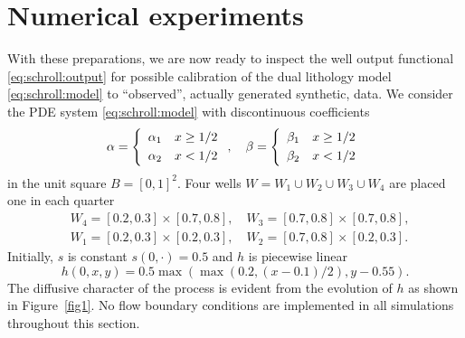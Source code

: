 \section{Numerical experiments}

With these preparations, we are now ready to inspect the well output
functional \eqref{eq:schroll:output} for possible calibration of
the dual lithology model \eqref{eq:schroll:model} to ``observed'',
actually generated synthetic, data.  We consider the PDE system
\eqref{eq:schroll:model} with discontinuous coefficients
\begin{equation}
 \alpha = \left\{
 \begin{array}{rl} \alpha_1 & x \ge 1/2 \\[\jot] \alpha_2 & x < 1/2 \end{array}
 \right .,
 \quad
 \beta = \left\{
 \begin{array}{rl} \beta_1 & x \ge 1/2 \\[\jot] \beta_2 & x < 1/2 \end{array}
 \right.
\end{equation}
in the unit square $B=[0,1]^2$.  Four wells $W = W_1 \cup W_2 \cup W_3
\cup W_4$ are placed one in each quarter
\begin{align}
 &W_4 = [0.2, 0.3] \times [0.7, 0.8], \quad
 W_3 = [0.7, 0.8] \times [0.7, 0.8],
\\
 &W_1 = [0.2, 0.3] \times [0.2, 0.3], \quad
 W_2 = [0.7, 0.8] \times [0.2, 0.3].
\end{align}
Initially, $s$ is constant $s(0,\cdot)=0.5$ and $h$ is piecewise linear
\begin{equation}
 h(0,x,y) = 0.5 \max(\max(0.2, (x-0.1)/2), y-0.55).
\end{equation}
The diffusive character of the process is evident from the evolution
of $h$ as shown in Figure~\ref{fig1}.  No flow boundary conditions are
implemented in all simulations throughout this section.


